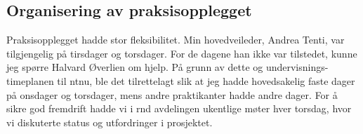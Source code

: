 \subsection{Organisering av praksisopplegget}
Praksisopplegget hadde stor fleksibilitet. Min hovedveileder, Andrea Tenti, var tilgjengelig på tirsdager og torsdager. For de dagene han ikke var tilstedet, kunne jeg spørre Halvard Øverlien om hjelp. På grunn av dette og undervisnings-timeplanen til \gls{ntnu}, ble det tilrettelagt slik at jeg hadde hovedsakelig faste dager på onsdager og torsdager, mens andre praktikanter hadde andre dager. For å sikre god fremdrift hadde vi i \gls{rnd} avdelingen ukentlige møter hver torsdag, hvor vi diskuterte status og utfordringer i prosjektet.